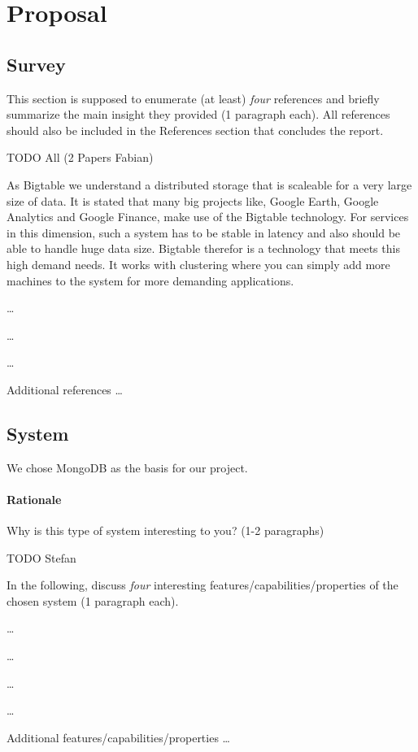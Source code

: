 \section{Proposal}

\subsection{Survey}

This section is supposed to enumerate (at least) \emph{four} references and
briefly summarize the main insight they provided (1 paragraph each). All
references should also be included in the References section that concludes the
report.

TODO All (2 Papers Fabian)

\begin{packed_enum}
   \item
As Bigtable we understand a distributed storage that is scaleable for a very large size of data. It is stated that many big projects like, Google Earth, Google Analytics and Google Finance, make use of the Bigtable technology. For services in this dimension, such a system has to be stable in latency and also should be able to handle huge data size. Bigtable therefor is a technology that meets this high demand needs. It works with clustering where you can simply add more machines to the system for more demanding applications.  \cite{bigTable}
   \item \ldots
   \item \ldots
   \item \ldots
   \item Additional references \ldots
\end{packed_enum}

\subsection{System}

We chose MongoDB as the basis for our project.

\paragraph{Rationale} Why is this type of system interesting to you? (1-2
paragraphs)

TODO Stefan

In the following, discuss \emph{four} interesting
features/capabilities/properties of the chosen system (1 paragraph each).
\begin{packed_enum}
    \item \ldots
    \item \ldots
    \item \ldots
    \item \ldots
    \item Additional features/capabilities/properties \ldots
\end{packed_enum}

